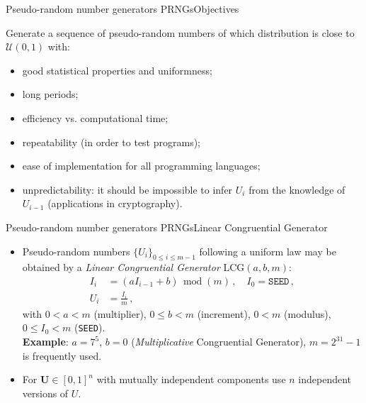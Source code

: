 \documentclass{beamer}
\newcommand{\demi}{\frac{1}{2}}
\newcommand{\esp}[1]{\mathbb{E}\{\smash{#1}\}}
\newcommand{\Ugj}{U}
\newcommand{\Ug}{{\boldsymbol\Ugj}}
\newcommand{\PDFU}{{\mathcal U}}
\begin{document}
\begin{frame}{Pseudo-random number generators PRNGs}{Objectives}

Generate a sequence of pseudo-random numbers of which distribution is close to $\PDFU(0,1)$ with: 
\begin{itemize}
\item good statistical properties and uniformness;
\item long periods;
\item efficiency vs. computational time;
\item repeatability (in order to test programs);
\item ease of implementation for all programming languages;
\item unpredictability: it should be impossible to infer $U_i$ from the knowledge of $U_{i-1}$ (applications in cryptography).
\end{itemize}
\end{frame}


\begin{frame}{Pseudo-random number generators PRNGs}{Linear Congruential Generator}

\begin{itemize}
\item Pseudo-random numbers $\{U_i\}_{0\leq i\leq m-1}$ following a uniform law may be obtained by a \emph{Linear Congruential Generator} LCG$(a,b,m)$:
\begin{displaymath}
\begin{split}
I_{i} &=(aI_{i-1}+b)\,\operatorname{mod}(m)\,,\quad I_0=\texttt{SEED}\,, \\
U_i &=\frac{I_i}{m}\,,
\end{split}
\end{displaymath}
with $0<a<m$ (multiplier), $0\leq b<m$ (increment), $0<m$ (modulus), $0\leq I_0<m$ (\texttt{SEED}).\\
{\footnotesize{{\bf Example}: $a=7^5$, $b=0$ (\emph{Multiplicative} Congruential Generator), $m=2^{31}-1$ is frequently used.}}
\item For $\Ug\in[0,1]^n$ with mutually independent components use $n$ independent versions of $U$.
\end{itemize}

\end{frame}
\end{document}
